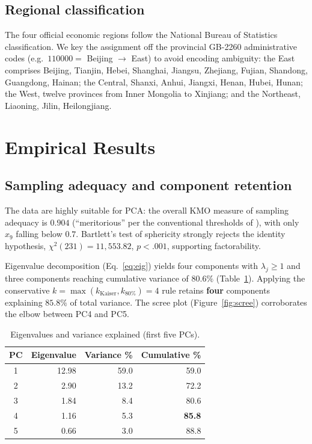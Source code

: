 \documentclass[12pt,letterpaper]{article}
\begin{document}
\subsection{Regional classification}

The four official economic regions follow the National Bureau of Statistics
classification.  We key the assignment off the provincial GB-2260 administrative
codes (e.g.~$110000=$ Beijing $\to$ East) to avoid encoding ambiguity:
the East comprises Beijing, Tianjin, Hebei, Shanghai, Jiangsu, Zhejiang, Fujian,
Shandong, Guangdong, Hainan; the Central, Shanxi, Anhui, Jiangxi, Henan, Hubei,
Hunan; the West, twelve provinces from Inner Mongolia to Xinjiang; and the
Northeast, Liaoning, Jilin, Heilongjiang.

\section{Empirical Results}\label{sec:results}

\subsection{Sampling adequacy and component retention}

The data are highly suitable for PCA: the overall KMO measure of sampling
adequacy is $0.904$ (``meritorious'' per the conventional thresholds of
\citealp{kaiser1974}), with only $x_{9}$ falling below $0.7$.  Bartlett's test
of sphericity strongly rejects the identity hypothesis,
$\chi^{2}(231) = 11{,}553.82$, $p<.001$, supporting factorability.

Eigenvalue decomposition (Eq.~\ref{eq:eig}) yields four components with
$\lambda_{j}\geq 1$ and three components reaching cumulative variance of $80.6\%$
(Table~\ref{tab:eigen}).  Applying the conservative
$k = \max(k_{\text{Kaiser}}, k_{80\%}) = 4$ rule retains \textbf{four}
components explaining $85.8\%$ of total variance.  The scree plot
(Figure~\ref{fig:scree}) corroborates the elbow between PC4 and PC5.

\begin{table}[H]
\centering
\caption{Eigenvalues and variance explained (first five PCs).}\label{tab:eigen}
\begin{tabular}{c r r r}
\toprule
\textbf{PC} & \textbf{Eigenvalue} & \textbf{Variance \%} & \textbf{Cumulative \%}\\
\midrule
1 & 12.98 & 59.0 & 59.0 \\
2 &  2.90 & 13.2 & 72.2 \\
3 &  1.84 &  8.4 & 80.6 \\
4 &  1.16 &  5.3 & \textbf{85.8} \\
5 &  0.66 &  3.0 & 88.8 \\
\bottomrule
\end{tabular}
\end{table}
\end{document}
